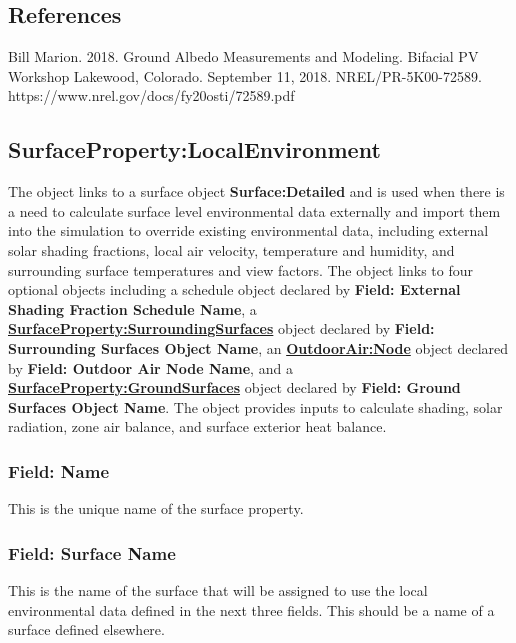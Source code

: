 \subsection{References}\label{references-gnd-srfs}

Bill Marion. 2018. Ground Albedo Measurements and Modeling. Bifacial PV Workshop Lakewood, Colorado. September 11, 2018.
NREL/PR-5K00-72589. https://www.nrel.gov/docs/fy20osti/72589.pdf

\subsection{SurfaceProperty:LocalEnvironment}\label{surfacePropertylocalEnvironment}

The object links to a surface object \textbf{Surface:Detailed} and is used when there is a need to calculate surface level environmental data externally and import them into the simulation to override existing environmental data, including external solar shading fractions, local air velocity, temperature and humidity, and surrounding surface temperatures and view factors. The object links to four optional objects including a schedule object declared by \textbf{Field: External Shading Fraction Schedule Name}, a \textbf{\hyperref[surfacePropertySurroundingSurfaces]{SurfaceProperty:SurroundingSurfaces}} object declared by \textbf{Field: Surrounding Surfaces Object Name}, an \textbf{\hyperref[outdoorairnode]{OutdoorAir:Node}} object declared by \textbf{Field: Outdoor Air Node Name}, and a \textbf{\hyperref[surfacePropertyGroundSurfaces]{SurfaceProperty:GroundSurfaces}} object declared by 
\textbf{Field: Ground Surfaces Object Name}. The object provides inputs to calculate shading, solar radiation, zone air balance, and surface exterior heat balance.

\subsubsection{Field: Name}\label{field-surf-localenv-name}

This is the unique name of the surface property.

\subsubsection{Field: Surface Name}\label{surfacePropertylocalEnvironment-field-surface-name}

This is the name of the surface that will be assigned to use the local environmental data defined in the next three fields.  This should be a name of a surface defined elsewhere.

